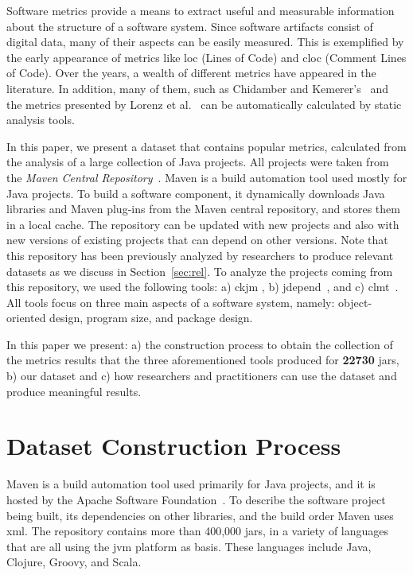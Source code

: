 \documentclass{sig-alternate}
\begin{document}
Software metrics provide a means to extract useful and measurable information about the structure of a software system. Since software artifacts consist of digital data, many of their aspects can be easily measured. This is exemplified by the early appearance of metrics like {\sc loc} (Lines of Code) and {\sc cloc} (Comment Lines of Code). Over the years, a wealth of different metrics have appeared in the literature. In addition, many of them, such as Chidamber and Kemerer's~\cite{CHKE94} and the metrics presented by Lorenz et al.~\cite{LOKI94} can be automatically calculated by static analysis tools.

In this paper, we present a dataset that contains popular metrics, calculated from the analysis of a large collection of Java projects. All projects were taken from the {\it Maven Central Repository}~\cite{MAVEN}. Maven is a build automation tool used mostly for Java projects. To build a software component, it dynamically downloads Java libraries and Maven plug-ins from the Maven central repository, and stores them in a local cache. The repository can be updated with new projects and also with new versions of existing projects that can depend on other versions. Note that this repository has been previously analyzed by researchers to produce relevant datasets as we discuss in Section~\ref{sec:rel}. To analyze the projects coming from this repository, we used the following tools: a) {\sc ckjm} \cite{Spi05g}, b) {\sc jd}epend~\cite{JDEPEND}, and c) {\sc clmt}~\cite{SGKL09}. All tools focus on three main aspects of a software system, namely: object-oriented design, program size, and package design.

In this paper we present: a) the construction process to obtain the collection of the metrics results that the three aforementioned tools produced for {\bf 22730} {\sc jar}s, b) our dataset and c) how researchers and practitioners can use the dataset and produce meaningful results.

\section{Dataset Construction Process}
\label{sec:data}

Maven is a build automation tool used primarily for Java projects, and it is hosted by the Apache Software Foundation~\cite{MAVEN}. To describe the software project being built, its dependencies on other libraries, and the build order Maven uses {\sc xml}. The repository contains more than 400,000 {\sc jar}s, in a variety of languages that are all using the {\sc jvm} platform as basis. These languages include Java, Clojure, Groovy, and Scala.
\end{document}
